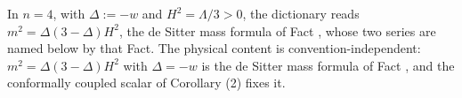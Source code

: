 
In $n = 4$, with $\Delta := -w$ and $H^{2} = \Lambda/3 > 0$, the dictionary reads $m^{2} = \Delta(3-\Delta)H^{2}$, the de Sitter mass formula of Fact , whose two series are named below by that Fact. The physical content is convention-independent: $m^{2} = \Delta(3-\Delta)H^{2}$ with $\Delta = -w$ is the de Sitter mass formula of Fact , and the conformally coupled scalar of Corollary (2) fixes it.
